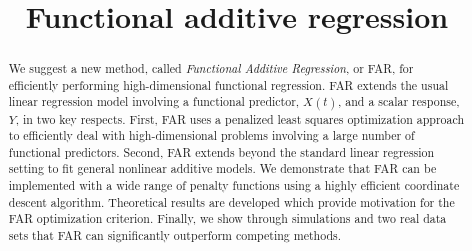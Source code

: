 \documentclass[aos,MSNbibl,dvips]{arximspdf}
\begin{document}
%
\begin{frontmatter}

\title{Functional additive regression}

%

%
%

%
\begin{abstract}
We suggest a new method, called \textit{Functional Additive
Regression}, or
FAR, for efficiently performing high-dimensional functional regression.
FAR extends the usual linear regression model involving a functional
predictor, $X(t)$, and a scalar response, $Y$, in two key respects.
First, FAR uses a penalized least squares optimization approach to
efficiently deal with high-dimensional problems involving a large number
of functional predictors. Second, FAR extends beyond the
standard linear regression setting to fit general nonlinear additive
models. We demonstrate that FAR can be implemented with a wide range of
penalty functions using a highly efficient coordinate descent
algorithm. Theoretical results are developed which provide motivation
for the FAR optimization criterion. Finally, we show through simulations
and two real data sets that FAR can significantly outperform competing methods.
\end{abstract}

%
\begin{keyword}[class=AMS]
\end{keyword}
%
\begin{keyword}
\end{keyword}
%
\end{frontmatter}
\end{document}
